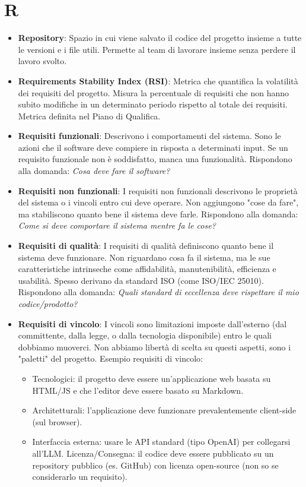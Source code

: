 \documentclass[11pt,a4paper]{article}
\begin{document}
\newpage

\section*{R}
\begin{itemize}
\item \textbf{Repository}: Spazio in cui viene salvato il codice del progetto insieme a tutte le versioni e i file utili. Permette al team di lavorare insieme senza perdere il lavoro svolto.

\item \textbf{Requirements Stability Index (RSI)}: Metrica che quantifica la volatilità dei requisiti del progetto. Misura la percentuale di requisiti che non hanno subito modifiche in un determinato periodo rispetto al totale dei requisiti. Metrica definita nel Piano di Qualifica.

\item \textbf{Requisiti funzionali}: Descrivono i comportamenti del sistema. Sono le azioni che il software deve compiere in risposta a determinati input. Se un requisito funzionale non è soddisfatto, manca una funzionalità. Rispondono alla domanda: \textit{Cosa deve fare il software?}

\item \textbf{Requisiti non funzionali}: I requisiti non funzionali descrivono le proprietà del sistema o i vincoli entro cui deve operare. Non aggiungono "cose da fare", ma stabiliscono quanto bene il sistema deve farle. Rispondono alla domanda: \textit{Come si deve comportare il sistema mentre fa le cose?}

\item \textbf{Requisiti di qualità}: I requisiti di qualità definiscono quanto bene il sistema deve funzionare. Non riguardano cosa fa il sistema, ma le sue caratteristiche intrinseche come affidabilità, manutenibilità, efficienza e usabilità. Spesso derivano da standard ISO (come ISO/IEC 25010).
Rispondono alla domanda: \textit{Quali standard di eccellenza deve rispettare il mio codice/prodotto?}

\item \textbf{Requisiti di vincolo}: I vincoli sono limitazioni imposte dall'esterno (dal committente, dalla legge, o dalla tecnologia disponibile) entro le quali dobbiamo muoverci. Non abbiamo libertà di scelta su questi aspetti, sono i "paletti" del progetto.
Esempio requisiti di vincolo:
\begin{itemize}
\item Tecnologici: il progetto deve essere un'applicazione web basata su HTML/JS e che l'editor deve essere basato su Markdown. 
\item Architetturali: l'applicazione deve funzionare prevalentemente client-side (sul browser).
\item Interfaccia esterna: usare le API standard (tipo OpenAI) per collegarsi all'LLM.
Licenza/Consegna: il codice deve essere pubblicato su un repository pubblico (es. GitHub) con licenza open-source (non so se considerarlo un requisito).
\end{itemize}


\end{itemize}
\end{document}
